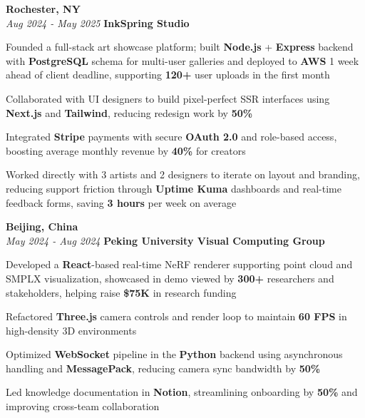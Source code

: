\begin{twocolentry}{
    \textbf{Rochester, NY} \\
    \textit{Aug 2024 - May 2025}
}{
    \textbf{InkSpring Studio} \\
}
\end{twocolentry}
\begin{onecolentry}
    \begin{highlights}
        \item Founded a full-stack art showcase platform; built \textbf{Node.js} + \textbf{Express} backend with \textbf{PostgreSQL} schema for multi-user galleries and deployed to \textbf{AWS} 1 week ahead of client deadline, supporting \textbf{120+} user uploads in the first month
        \item Collaborated with UI designers to build pixel-perfect SSR interfaces using \textbf{Next.js} and \textbf{Tailwind}, reducing redesign work by \textbf{50\%}
        \item Integrated \textbf{Stripe} payments with secure \textbf{OAuth 2.0} and role-based access, boosting average monthly revenue by \textbf{40\%} for creators
        \item Worked directly with 3 artists and 2 designers to iterate on layout and branding, reducing support friction through \textbf{Uptime Kuma} dashboards and real-time feedback forms, saving \textbf{3 hours} per week on average
    \end{highlights}
\end{onecolentry}

\vspace{0.2cm}

\begin{twocolentry}{
    \textbf{Beijing, China} \\
    \textit{May 2024 - Aug 2024}
}{
    \textbf{Peking University Visual Computing Group} \\
}
\end{twocolentry}
\begin{onecolentry}
    \begin{highlights}
        \item Developed a \textbf{React}-based real-time NeRF renderer supporting point cloud and SMPLX visualization, showcased in demo viewed by \textbf{300+} researchers and stakeholders, helping raise \textbf{\$75K} in research funding
        \item Refactored \textbf{Three.js} camera controls and render loop to maintain \textbf{60 FPS} in high-density 3D environments
        \item Optimized \textbf{WebSocket} pipeline in the \textbf{Python} backend using asynchronous handling and \textbf{MessagePack}, reducing camera sync bandwidth by \textbf{50\%}
        \item Led knowledge documentation in \textbf{Notion}, streamlining onboarding by \textbf{50\%} and improving cross-team collaboration
    \end{highlights}
\end{onecolentry}